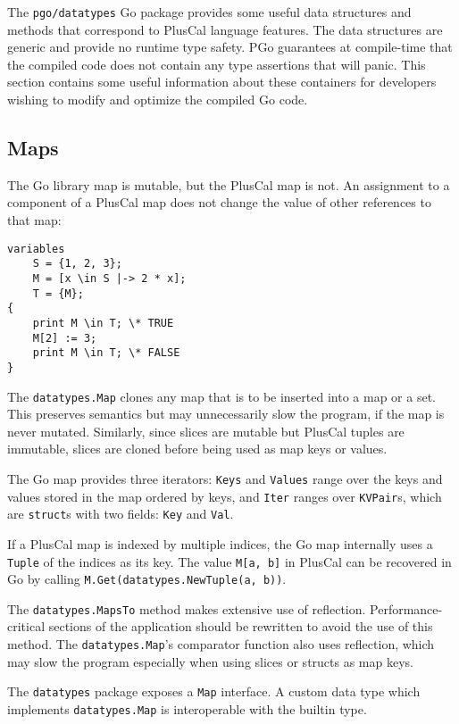 The \texttt{pgo/datatypes} Go package provides some useful data structures and methods that correspond to PlusCal language features. The data structures are generic and provide no runtime type safety. PGo guarantees at compile-time that the compiled code does not contain any type assertions that will panic. This section contains some useful information about these containers for developers wishing to modify and optimize the compiled Go code.

\subsection{Maps}
The Go library map is mutable, but the PlusCal map is not. An assignment to a component of a PlusCal map does not change the value of other references to that map:

\begin{minipage}[t]{\textwidth}
\begin{lstlisting}[language=pcal]
variables
	S = {1, 2, 3};
	M = [x \in S |-> 2 * x];
	T = {M};
{
	print M \in T; \* TRUE
	M[2] := 3;
	print M \in T; \* FALSE
}
\end{lstlisting}
\end{minipage}

The \texttt{datatypes.Map} clones any map that is to be inserted into a map or a set. This preserves semantics but may unnecessarily slow the program, if the map is never mutated. Similarly, since slices are mutable but PlusCal tuples are immutable, slices are cloned before being used as map keys or values.

The Go map provides three iterators: \texttt{Keys} and \texttt{Values} range over the keys and values stored in the map ordered by keys, and \texttt{Iter} ranges over \texttt{KVPair}s, which are \texttt{struct}s with two fields: \texttt{Key} and \texttt{Val}.

If a PlusCal map is indexed by multiple indices, the Go map internally uses a \texttt{Tuple} of the indices as its key. The value \verb|M[a, b]| in PlusCal can be recovered in Go by calling \verb|M.Get(datatypes.NewTuple(a, b))|.

The \texttt{datatypes.MapsTo} method makes extensive use of reflection. Performance-critical sections of the application should be rewritten to avoid the use of this method. The \texttt{datatypes.Map}'s comparator function also uses reflection, which may slow the program especially when using slices or structs as map keys.

The \texttt{datatypes} package exposes a \texttt{Map} interface. A custom data type which implements \texttt{datatypes.Map} is interoperable with the builtin type.


